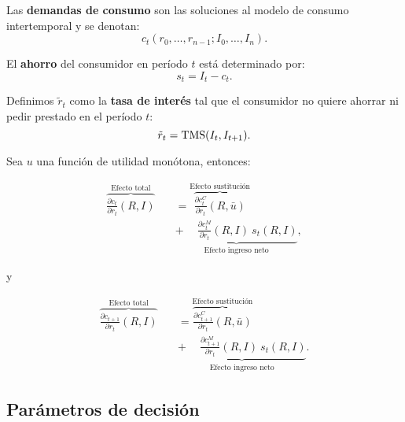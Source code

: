 \documentclass[8pt,a4paper]{extarticle}
\begin{document}
\begin{multicols}{3}
\begin{boxdef}
	Las \textbf{demandas de consumo} son las soluciones al modelo de consumo intertemporal y se denotan:
	\[
		c_t(r_0, \ldots, r_{n-1}; I_0, \ldots, I_n)
	.\] 
\end{boxdef}

\begin{boxdef}[Ahorro]
	El \textbf{ahorro} del consumidor en período $t$ está determinado por:
	\[
		s_t = I_t - c_t
	.\] 
\end{boxdef}

\begin{boxdef}
	Definimos $\tilde{r}_t$ como la \textbf{tasa de interés} tal que el consumidor no quiere ahorrar ni pedir prestado en el período $t$:
	\[
		\tilde{r}_t = \text{\normalfont TMS} (I_t, I_{t+1})
	.\] 
\end{boxdef}

\begin{boxtheo}
	Sea $u$ una función de utilidad monótona, entonces:
	
	\begin{equation*}
	\begin{aligned}
		\overbrace{\frac{\partial c_t}{\partial r_t} (R, I)}^{\text{Efecto total}} \quad &= \overbrace{\frac{\partial c_t^C}{\partial r_t} (R, \bar{u})}^{\text{Efecto sustitución}} \\
																						   & \underbrace{ + \quad\ \frac{\partial c_t^M}{\partial r_t} (R, I)\ s_t (R, I)}_{\text{Efecto ingreso neto}},
	\end{aligned}
	\end{equation*}	

	y

	\begin{equation*}
	\begin{aligned}
		\overbrace{\frac{\partial c_{t+1}}{\partial r_t} (R, I)}^{\text{Efecto total}} \quad &= \overbrace{\frac{\partial c_{t+1}^C}{\partial r_t} (R, \bar{u})}^{\text{Efecto sustitución}} \\
																					   & \underbrace{ + \quad\ \frac{\partial c_{t+1}^M}{\partial r_t} (R, I)\ s_t (R, I)}_{\text{Efecto ingreso neto}}.
	\end{aligned}
	\end{equation*}	
	
\end{boxtheo}

\sectionbreak

\subsection{Parámetros de decisión}


\end{multicols}
\end{document}
